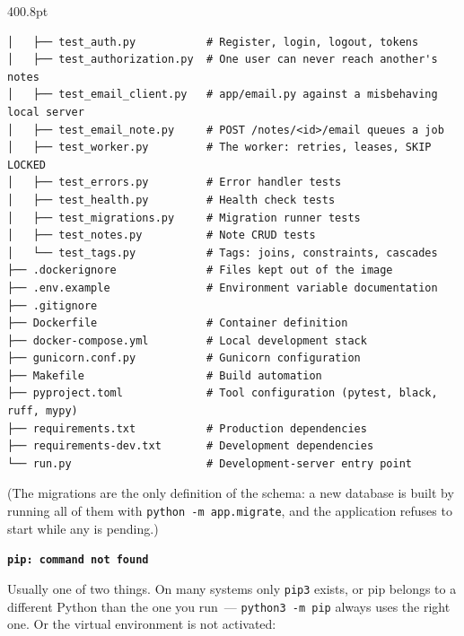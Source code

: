 \begin{diagrambox}{400.8pt}
\begin{Verbatim}[fontsize=\fontsize{7.5}{7.12}\selectfont]
│   ├── test_auth.py           # Register, login, logout, tokens
│   ├── test_authorization.py  # One user can never reach another's notes
│   ├── test_email_client.py   # app/email.py against a misbehaving local server
│   ├── test_email_note.py     # POST /notes/<id>/email queues a job
│   ├── test_worker.py         # The worker: retries, leases, SKIP LOCKED
│   ├── test_errors.py         # Error handler tests
│   ├── test_health.py         # Health check tests
│   ├── test_migrations.py     # Migration runner tests
│   ├── test_notes.py          # Note CRUD tests
│   └── test_tags.py           # Tags: joins, constraints, cascades
├── .dockerignore              # Files kept out of the image
├── .env.example               # Environment variable documentation
├── .gitignore
├── Dockerfile                 # Container definition
├── docker-compose.yml         # Local development stack
├── gunicorn.conf.py           # Gunicorn configuration
├── Makefile                   # Build automation
├── pyproject.toml             # Tool configuration (pytest, black, ruff, mypy)
├── requirements.txt           # Production dependencies
├── requirements-dev.txt       # Development dependencies
└── run.py                     # Development-server entry point
\end{Verbatim}
\end{diagrambox}

\noindent{}(The migrations are the only definition of the schema: a new database is built by running all of them with \texttt{python\ -m\ app.migrate}, and the application refuses to start while any is pending.)

\label{44-appendices:a5-common-pip-issues-and-fixes}

\textbf{\texttt{pip:\ command\ not\ found}}

Usually one of two things. On many systems only \texttt{pip3} exists, or pip belongs to a different Python than the one you run~--- \texttt{python3\ -m\ pip} always uses the right one. Or the virtual environment is not activated:

\begin{codebox}[short]

\begin{Shaded}
\begin{Highlighting}[]
\end{Highlighting}
\end{Shaded}

\end{codebox}

